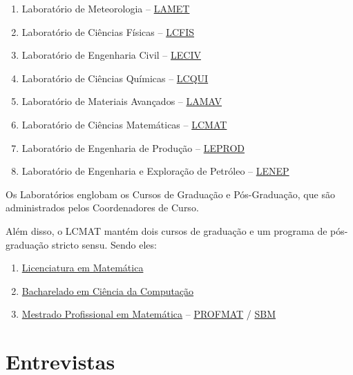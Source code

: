     \begin{enumerate}
        \item Laboratório de Meteorologia – \href{https://uenf.br/cct/administracao/laboratorios/}{LAMET}
        \item Laboratório de Ciências Físicas – \href{https://uenf.br/cct/lcmat/}{LCFIS}
        \item Laboratório de Engenharia Civil – \href{https://uenf.br/cct/administracao/laboratorios/}{LECIV}
        \item Laboratório de Ciências Químicas – \href{https://uenf.br/cct/administracao/laboratorios/}{LCQUI}
        \item Laboratório de Materiais Avançados – \href{https://uenf.br/cct/administracao/laboratorios/}{LAMAV}
        \item Laboratório de Ciências Matemáticas – \href{https://uenf.br/cct/administracao/laboratorios/}{LCMAT}
        \item Laboratório de Engenharia de Produção – \href{https://uenf.br/cct/administracao/laboratorios/}{LEPROD}
        \item Laboratório de Engenharia e Exploração de Petróleo – \href{https://uenf.br/cct/administracao/laboratorios/}{LENEP}
    \end{enumerate}

    Os Laboratórios englobam os Cursos de Graduação e Pós-Graduação, que são administrados pelos Coordenadores de Curso.

    Além disso, o LCMAT mantém dois cursos de graduação e um programa de pós-graduação stricto sensu. Sendo eles:
    
    \begin{enumerate}
        \item \href{https://uenf.br/posgraduacao/licenciatura-matematica/}{Licenciatura em Matemática}
        \item \href{https://cc.uenf.br/}{Bacharelado em Ciência da Computação}
        \item \href{https://uenf.br/posgraduacao/matematica/apresentacao/}{Mestrado Profissional em Matemática} – \href{https://uenf.br/posgraduacao/programas/pos-graduacao-stricto-sensu/}{PROFMAT} / \href{https://www.profmat-sbm.org.br/}{SBM}
    \end{enumerate}

\section{Entrevistas} %


